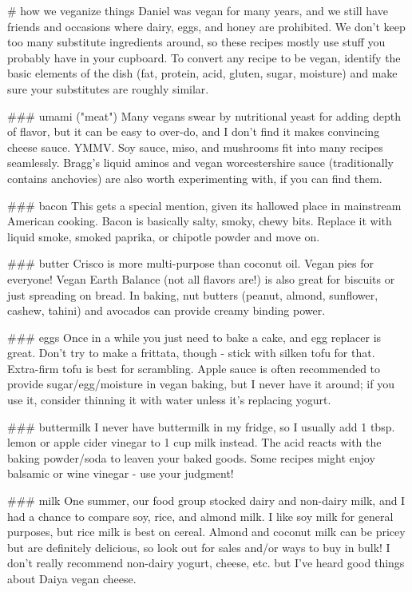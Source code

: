 # how we veganize things
Daniel was vegan for many years, and we still have friends and occasions where dairy, eggs, and honey are prohibited. We don't keep too many substitute ingredients around, so these recipes mostly use stuff you probably have in your cupboard. To convert any recipe to be vegan, identify the basic elements of the dish (fat, protein, acid, gluten, sugar, moisture) and make sure your substitutes are roughly similar.

### umami ("meat")
Many vegans swear by nutritional yeast for adding depth of flavor, but it can be easy to over-do, and I don't find it makes convincing cheese sauce. YMMV. Soy sauce, miso, and mushrooms fit into many recipes seamlessly. Bragg's liquid aminos and vegan worcestershire sauce (traditionally contains anchovies) are also worth experimenting with, if you can find them.

### bacon
This gets a special mention, given its hallowed place in mainstream American cooking. Bacon is basically salty, smoky, chewy bits. Replace it with liquid smoke, smoked paprika, or chipotle powder and move on.

### butter
Crisco is more multi-purpose than coconut oil. Vegan pies for everyone! Vegan Earth Balance (not all flavors are!) is also great for biscuits or just spreading on bread. In baking, nut butters (peanut, almond, sunflower, cashew, tahini) and avocados can provide creamy binding power.

### eggs
Once in a while you just need to bake a cake, and egg replacer is great. Don't try to make a frittata, though - stick with silken tofu for that. Extra-firm tofu is best for scrambling. Apple sauce is often recommended to provide sugar/egg/moisture in vegan baking, but I never have it around; if you use it, consider thinning it with water unless it's replacing yogurt.

### buttermilk
I never have buttermilk in my fridge, so I usually add 1 tbsp. lemon or apple cider vinegar to 1 cup milk instead. The acid reacts with the baking powder/soda to leaven your baked goods. Some recipes might enjoy balsamic or wine vinegar - use your judgment!

### milk
One summer, our food group stocked dairy and non-dairy milk, and I had a chance to compare soy, rice, and almond milk. I like soy milk for general purposes, but rice milk is best on cereal. Almond and coconut milk can be pricey but are definitely delicious, so look out for sales and/or ways to buy in bulk! I don't really recommend non-dairy yogurt, cheese, etc. but I've heard good things about Daiya vegan cheese.

